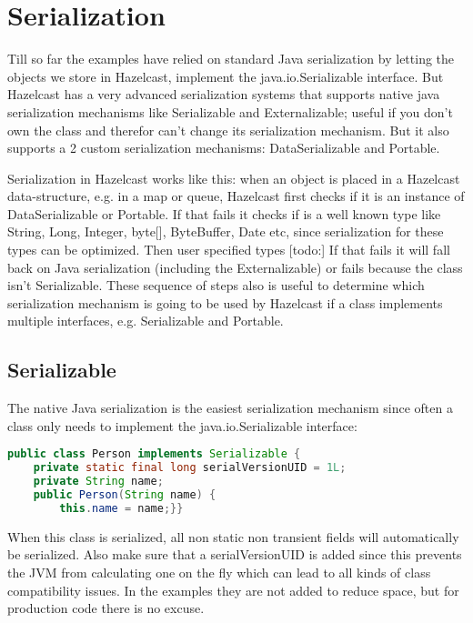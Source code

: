 \chapter{Serialization}
Till so far the examples have relied on standard Java serialization by letting the objects we store in Hazelcast, implement the java.io.Serializable interface. But Hazelcast has a very advanced serialization systems that supports native java serialization mechanisms like Serializable and Externalizable;  useful if you don't own the class and therefor can't change its serialization mechanism. But it also supports a 2 custom serialization mechanisms: DataSerializable and Portable.

Serialization in Hazelcast works like this: when an object is placed in a Hazelcast data-structure, e.g. in a map or queue, Hazelcast first checks if it is an instance of DataSerializable or Portable. If that fails it checks if is a well known type like String, Long, Integer, byte[], ByteBuffer, Date etc, since serialization for these types can be optimized. Then user specified types [todo:] If that fails it will fall back on Java serialization (including the Externalizable) or fails because the class isn't Serializable. These sequence of steps also is useful to determine which serialization mechanism is going to be used by Hazelcast if a class implements multiple interfaces, e.g. Serializable and Portable.

\section{Serializable}
The native Java serialization is the easiest serialization mechanism since often a class only needs to implement the java.io.Serializable interface:
\begin{lstlisting}[language=java]
public class Person implements Serializable {
    private static final long serialVersionUID = 1L;
    private String name;
    public Person(String name) {
        this.name = name;}}
\end{lstlisting}
When this class is serialized, all non static non transient fields will automatically be serialized. Also make sure that a serialVersionUID is added since this prevents the JVM from calculating one on the fly which can lead to all kinds of class compatibility issues. In the examples they are not added to reduce space, but for production code there is no excuse.

